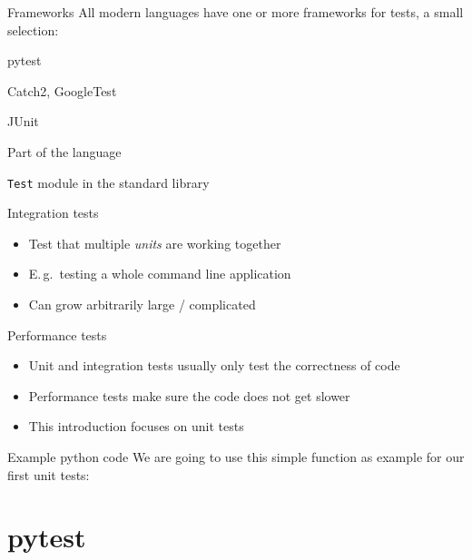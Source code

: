 \begin{frame}[c]{Frameworks}
  All modern languages have one or more frameworks for tests, a small selection:

  \begin{description}[Python]
    \item[Python] pytest
    \item[C++] Catch2, GoogleTest
    \item[Java] JUnit
    \item[Rust] Part of the language
    \item[Julia] \texttt{Test} module in the standard library
  \end{description}
\end{frame}

\begin{frame}[c]{Integration tests}
  \begin{itemize}
    \item Test that multiple \emph{units} are working together
    \item E.\,g.\ testing a whole command line application
    \item Can grow arbitrarily large / complicated
  \end{itemize}
\end{frame}

\begin{frame}[c]{Performance tests}
  \begin{itemize}
    \item Unit and integration tests usually only test the correctness of code
    \item Performance tests make sure the code does not get slower
    \item This introduction focuses on unit tests
  \end{itemize}
\end{frame}

\begin{frame}[c, fragile]{Example python code}
  We are going to use this simple function as example for our first unit tests:
\end{frame}

\section{pytest}

